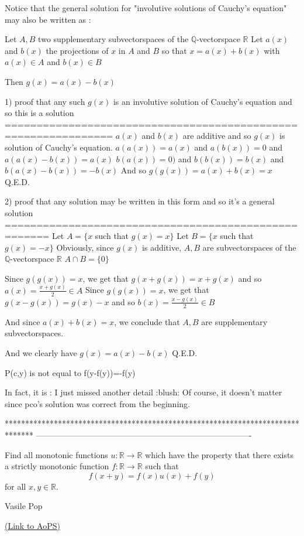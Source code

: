 \begin{solution}
	Notice that the general solution for "involutive solutions of Cauchy's equation" may also be written as :

Let $A,B$ two supplementary subvectorspaces of the $\mathbb Q$-vectorspace $\mathbb R$
Let $a(x)$  and $b(x)$ the projections of $x$ in $A$ and $B$ so that $x=a(x)+b(x)$ with $a(x)\in A$ and $b(x)\in B$

Then $g(x)=a(x)-b(x)$

1) proof that any such $g(x)$ is an involutive solution of Cauchy's equation and so this is a solution
===============================================================
$a(x)$ and $b(x)$ are additive and so $g(x)$ is solution of Cauchy's equation.
$a(a(x))=a(x)$ and $a(b(x))=0$ and $a(a(x)-b(x))=a(x)$
$b(a(x))=0)$ and $b(b(x))=b(x)$ and $b(a(x)-b(x))=-b(x)$
And so $g(g(x))=a(x)+b(x)=x$
Q.E.D.

2) proof that any solution may be written in this form and so it's a general solution
=====================================================
Let $A=\{x$ such that $g(x)=x\}$
Let $B=\{x$ such that $g(x)=-x\}$
Obviously, since $g(x)$ is additive, $A,B$ are subvectorspaces of the $\mathbb Q$-vectorspace $\mathbb R$
$A\cap B=\{0\}$

Since $g(g(x))=x$, we get that $g(x+g(x))=x+g(x)$ and so $a(x)=\frac{x+g(x)}2\in A$
Since $g(g(x))=x$, we get that $g(x-g(x))=g(x)-x$ and so $b(x)=\frac{x-g(x)}2\in B$

And since $a(x)+b(x)=x$, we conclude that $A,B$ are supplementary subvectorspaces.

And we clearly have $g(x)=a(x)-b(x)$
Q.E.D.
\end{solution}



\begin{solution}
	\begin{tcolorbox}P(c,y) is not equal to f(y-f(y))=-f(y)\end{tcolorbox}
In fact, it is : I just missed another detail  :blush: 
Of course, it doesn't matter since pco's solution was correct from the beginning.
\end{solution}
*******************************************************************************
-------------------------------------------------------------------------------

\begin{problem}
	Find all monotonic functions $u:\mathbb{R}\rightarrow\mathbb{R}$ which have the property that there exists a strictly monotonic function $f:\mathbb{R}\rightarrow\mathbb{R}$ such that
\[f(x+y)=f(x)u(x)+f(y) \]
for all $x,y\in\mathbb{R}$.

\begin{italicized}Vasile Pop\end{italicized}
	\flushright \href{https://artofproblemsolving.com/community/c6h403521}{(Link to AoPS)}
\end{problem}



